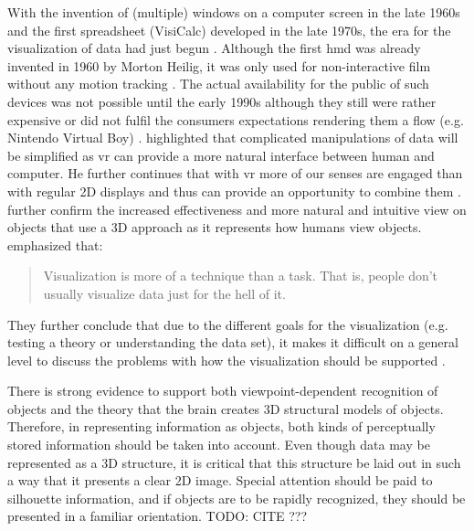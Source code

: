 With the invention of (multiple) windows on a computer screen in the late 1960s and the first spreadsheet (VisiCalc) developed in the late 1970s, the era for the visualization of data had just begun \citep{Myers1998}. Although the first \gls{hmd} was already invented in 1960 by Morton Heilig, it was only used for non-interactive film without any motion tracking \citep{vrs2015}. The actual availability for the public of such devices was not possible until the early 1990s although they still were rather expensive or did not fulfil the consumers expectations rendering them a flow (e.g. Nintendo Virtual Boy) \citep{vrs2015}. \cite{Ribarsky1994} highlighted that complicated manipulations of data will be simplified as \gls{vr} can provide a more natural interface between human and computer. He further continues that with \gls{vr} more of our senses are engaged than with regular 2D displays and thus can provide an opportunity to combine them \citep{Ribarsky1994}. \cite{Jamieson2007} further confirm the increased effectiveness and more natural and intuitive view on objects that use a 3D approach as it represents how humans view objects. \newline
\citet[p.411]{Stone1994} emphasized that: \blockquote{Visualization is more of a technique than a task. That is, people don't usually visualize data just for the hell of it.}
They further conclude that due to the different goals for the visualization (e.g. testing a theory or understanding the data set), it makes it difficult on a general level to discuss the problems with how the visualization should be supported \citep{Stone1994}.



There is strong evidence to support both viewpoint-dependent recognition of objects and the theory  that  the  brain  creates  3D  structural  models  of  objects.  Therefore,  in  representing  information as objects, both kinds of perceptually stored information should be taken into account. Even though data may be represented as a 3D structure, it is critical that this structure be laid out in such a way that it presents a clear 2D image. Special attention should be paid to silhouette information, and if objects are to be rapidly recognized, they should be presented in a familiar orientation.
TODO: CITE ???


